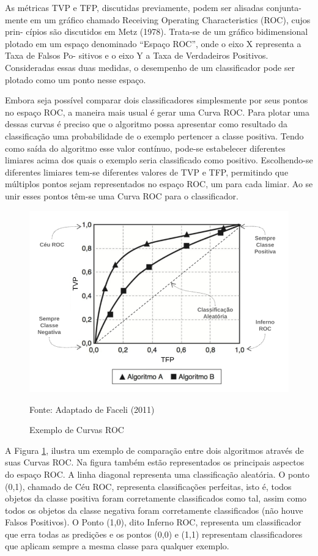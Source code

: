\documentclass[openright]{UFRGS} %
\begin{document}
As métricas TVP e TFP, discutidas previamente, podem ser alisadas conjunta-
mente em um gráfico chamado Receiving Operating Characteristics (ROC), cujos prin-
cípios são discutidos em Metz (1978). Trata-se de um gráfico bidimensional plotado em
um espaço denominado “Espaço ROC”, onde o eixo X representa a Taxa de Falsos Po-
sitivos e o eixo Y a Taxa de Verdadeiros Positivos. Consideradas essas duas medidas, o
desempenho de um classificador pode ser plotado como um ponto nesse espaço.

Embora seja possível comparar dois classificadores simplesmente por seus pontos
no espaço ROC, a maneira mais usual é gerar uma Curva ROC. Para plotar uma dessas curvas é preciso que o algoritmo possa apresentar como resultado da classificação
uma probabilidade de o exemplo pertencer a classe positiva. Tendo como saída do algoritmo esse valor contínuo, pode-se estabelecer diferentes limiares acima dos quais o
exemplo seria classificado como positivo. Escolhendo-se diferentes limiares tem-se diferentes valores de TVP e TFP, permitindo que múltiplos pontos sejam representados no espaço ROC, um para cada limiar. Ao se unir esses pontos têm-se uma Curva ROC para
o classificador.

\begin{figure}[h]
    \centering
    \caption{Exemplo de Curvas ROC}
    \includegraphics[scale=0.40]{curvarocexemplo.png}
    \centerline{Fonte: Adaptado de Faceli (2011)}
    \label{fig:curvarocexempl}
\end{figure}


A Figura \ref{fig:curvarocexempl}, ilustra um exemplo de comparação entre dois algoritmos através de
suas Curvas ROC. Na figura também estão representados os principais aspectos do espaço
ROC. A linha diagonal representa uma classificação aleatória. O ponto (0,1), chamado
de Céu ROC, representa classificações perfeitas, isto é, todos objetos da classe positiva
foram corretamente classificados como tal, assim como todos os objetos da classe negativa
foram corretamente classificados (não houve Falsos Positivos). O Ponto (1,0), dito Inferno
ROC, representa um classificador que erra todas as predições e os pontos (0,0) e (1,1)
representam classificadores que aplicam sempre a mesma classe para qualquer exemplo.
\end{document}
